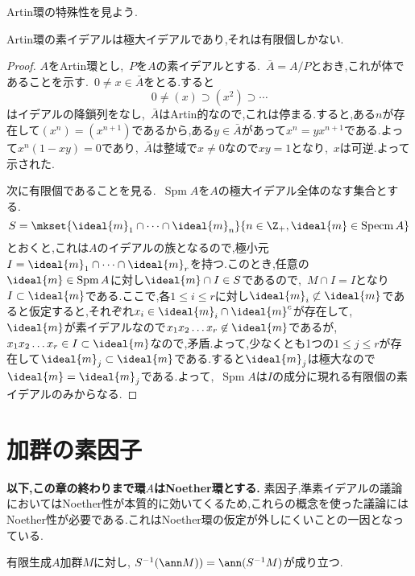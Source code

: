 Artin環の特殊性を見よう.
\begin{prop}\label{prop:Artinの素イデアル}
	Artin環の素イデアルは極大イデアルであり,それは有限個しかない.
\end{prop}
\begin{proof}
	$A$をArtin環とし,~$ P$を$A$の素イデアルとする.~$\bar{A}=A/ P$とおき,これが体であることを示す.~$0\neq x\in\bar{A}$をとる.すると
	\[0\neq(x)\supset(x^2)\supset\cdots\]
	はイデアルの降鎖列をなし,~$\bar{A}$はArtin的なので,これは停まる.すると,ある$n$が存在して$(x^n)=(x^{n+1})$であるから,ある$y\in\bar{A}$があって$x^n=yx^{n+1}$である.よって$x^n(1-xy)=0$であり,~$\bar{A}$は整域で$x\neq0$なので$xy=1$となり,~$x$は可逆.よって示された.
	
	次に有限個であることを見る.~$\operatorname{Spm}A$を$A$の極大イデアル全体のなす集合とする.
	\[S=\mkset{\ideal{m}_1\cap\dots\cap\ideal{m}_n}{n\in\Z_+,\ideal{m}\in\operatorname{Specm}A}\]
	とおくと,これは$A$のイデアルの族となるので,極小元$I=\ideal{m}_1\cap\dots\cap\ideal{m}_r$を持つ.このとき,任意の$\ideal{m}\in\operatorname{Spm}A$に対し$\ideal{m}\cap I\in S$であるので,~$M\cap I=I$となり$I\subset\ideal{m}$である.ここで,各$1\leq i\leq r$に対し$\ideal{m}_i\not\subset\ideal{m}$であると仮定すると,それぞれ$x_i\in\ideal{m}_i\cap\ideal{m}^c$が存在して,~$\ideal{m}$が素イデアルなので$x_1x_2\dots x_r\not\in\ideal{m}$であるが,~$x_1x_2\dots x_r\in I\subset\ideal{m}$なので,矛盾.よって,少なくとも1つの$1\leq j\leq r$が存在して$\ideal{m}_j\subset\ideal{m}$である.すると$\ideal{m}_j$は極大なので$\ideal{m}=\ideal{m}_j$である.よって,~$\operatorname{Spm}A$は$I$の成分に現れる有限個の素イデアルのみからなる.
\end{proof}

\section{加群の素因子}

\textbf{以下,この章の終わりまで環$A$はNoether環とする.} 素因子,準素イデアルの議論においてはNoether性が本質的に効いてくるため,これらの概念を使った議論にはNoether性が必要である.これはNoether環の仮定が外しにくいことの一因となっている.

\begin{lem}
	有限生成$A$加群$M$に対し, $S^{-1}(\ann M))=\ann(S^{-1}M)$が成り立つ. 
\end{lem}

